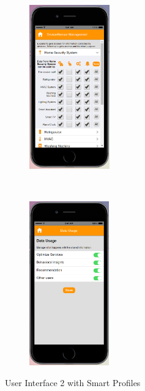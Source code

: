 \begin{appendices}
\begin{figure}[htb]
\begin{subfigure}[t]{0.2\textwidth}
	\end{subfigure}%
	~~~~~
	\begin{subfigure}[t]{0.2\textwidth}
		\centering
		\includegraphics[height=2.8in]{figures/ui2sp4.png}
	\end{subfigure}%
	~~~~~
	\begin{subfigure}[t]{0.2\textwidth}
		\centering
		\includegraphics[height=2.8in]{figures/ui2sp5.png}
	\end{subfigure}%
	\caption{User Interface 2 with Smart Profiles}
	\label{fig:ui2Profiles}
\end{figure}



\end{appendices}